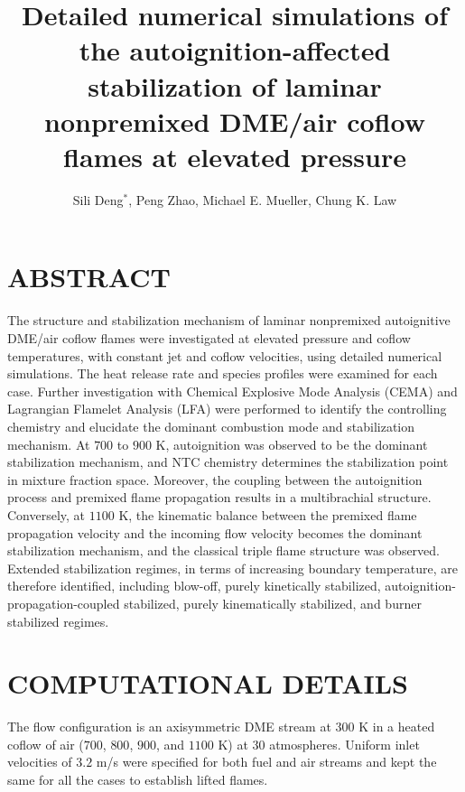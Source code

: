 \documentclass[twocolumn,10pt]{hphrc}
\title{Detailed numerical simulations of the autoignition-affected stabilization of laminar nonpremixed DME/air coflow flames at elevated pressure}
\author{Sili Deng$^*$, Peng Zhao, Michael E. Mueller, Chung K. Law
    \affiliation{
	Department of Mechanical and Aerospace Engineering\\
	Princeton University\\
    $^*$silideng@princeton.edu
    }	
}
\begin{document}
\maketitle   %

\fontsize{9}{11}\selectfont

\section*{ABSTRACT}

The structure and stabilization mechanism of laminar nonpremixed autoignitive DME/air coflow flames were investigated at elevated pressure and coflow temperatures, with constant jet and coflow velocities, using detailed numerical simulations.  The heat release rate and species profiles were examined for each case. Further investigation with Chemical Explosive Mode Analysis (CEMA) and Lagrangian Flamelet Analysis (LFA) were performed to identify the controlling chemistry and elucidate the dominant combustion mode and stabilization mechanism.  At $700$ to $900$ K, autoignition was observed to be the dominant stabilization mechanism, and NTC chemistry determines the stabilization point in mixture fraction space.  Moreover, the coupling between the autoignition process and premixed flame propagation results in a multibrachial structure.  Conversely, at $1100$ K, the kinematic balance between the premixed flame propagation velocity and the incoming flow velocity becomes the dominant stabilization mechanism, and the classical triple flame structure was observed.  Extended stabilization regimes, in terms of increasing boundary temperature, are therefore identified, including blow-off, purely kinetically stabilized, autoignition-propagation-coupled stabilized, purely kinematically stabilized, and burner stabilized regimes.

\section*{COMPUTATIONAL DETAILS}

The flow configuration is an axisymmetric DME stream at $300$ K in a heated coflow of air ($700$, $800$, $900$, and $1100$ K) at $30$ atmospheres.  Uniform inlet velocities of $3.2$ m/s were specified for both fuel and air streams and kept the same for all the cases to establish lifted flames.
\end{document}
